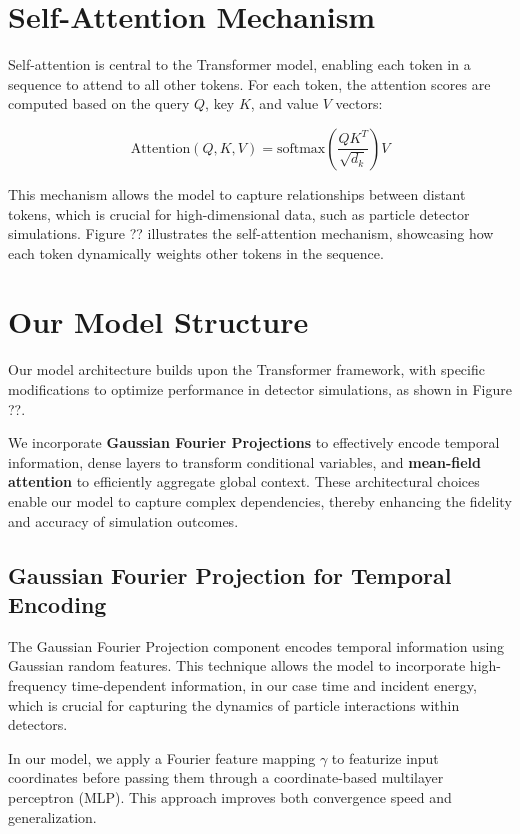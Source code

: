 \section{Self-Attention Mechanism}
Self-attention is central to the Transformer model, enabling each token in a sequence to attend to all other tokens. For each token, the attention scores are computed based on the query \( Q \), key \( K \), and value \( V \) vectors:

\begin{equation}
\text{Attention}(Q, K, V) = \text{softmax} \left( \frac{QK^T}{\sqrt{d_k}} \right) V
\end{equation}

This mechanism allows the model to capture relationships between distant tokens, which is crucial for high-dimensional data, such as particle detector simulations. Figure ?? illustrates the self-attention mechanism, showcasing how each token dynamically weights other tokens in the sequence.

\section{Our Model Structure}
Our model architecture builds upon the Transformer framework, with specific modifications to optimize performance in detector simulations, as shown in Figure ??.

We incorporate \textbf{Gaussian Fourier Projections} \cite{tancik_fourier_2020} to effectively encode temporal information, dense layers to transform conditional variables, and \textbf{mean-field attention} \cite{kach_pay_2024} to efficiently aggregate global context. These architectural choices enable our model to capture complex dependencies, thereby enhancing the fidelity and accuracy of simulation outcomes.

\subsection{Gaussian Fourier Projection for Temporal Encoding}
The Gaussian Fourier Projection component encodes temporal information using Gaussian random features. This technique allows the model to incorporate high-frequency time-dependent information, in our case time and incident energy, which is crucial for capturing the dynamics of particle interactions within detectors.

In our model, we apply a Fourier feature mapping \( \gamma \) to featurize input coordinates before passing them through a coordinate-based multilayer perceptron (MLP). This approach improves both convergence speed and generalization.

